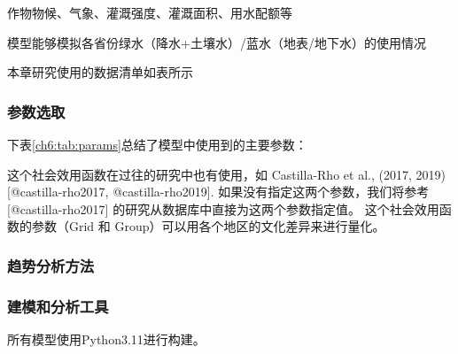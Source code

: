 作物物候、气象、灌溉强度、灌溉面积、用水配额等

模型能够模拟各省份绿水（降水+土壤水）/蓝水（地表/地下水）的使用情况

本章研究使用的数据清单如表所示

\subsubsection*{参数选取}

下表\ref{ch6:tab:params}总结了模型中使用到的主要参数：

这个社会效用函数在过往的研究中也有使用，如 Castilla-Rho et al., (2017, 2019) [@castilla-rho2017, @castilla-rho2019]. 如果没有指定这两个参数，我们将参考 [@castilla-rho2017] 的研究从数据库中直接为这两个参数指定值。
这个社会效用函数的参数（Grid 和 Group）可以用各个地区的文化差异来进行量化。


\subsubsection*{趋势分析方法}


\subsubsection*{建模和分析工具}

所有模型使用Python3.11进行构建。
